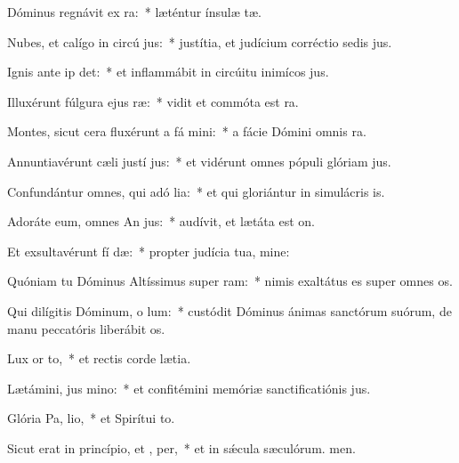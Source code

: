 \item Dóminus regnávit ex ra:~* læténtur ínsulæ tæ.
\item Nubes, et calígo in circú jus:~* justítia, et judícium corréctio sedis jus.
\item Ignis ante ip det:~* et inflammábit in circúitu inimícos jus.
\item Illuxérunt fúlgura ejus  ræ:~* vidit et commóta est ra.
\item Montes, sicut cera fluxérunt a fá mini:~* a fácie Dómini omnis ra.
\item Annuntiavérunt cæli justí jus:~* et vidérunt omnes pópuli glóriam jus.
\item Confundántur omnes, qui adó lia:~* et qui gloriántur in simulácris is.
\item Adoráte eum, omnes An jus:~* audívit, et lætáta est on.
\item Et exsultavérunt fí dæ:~* propter judícia tua, mine:
\item Quóniam tu Dóminus Altíssimus super  ram:~* nimis exaltátus es super omnes os.
\item Qui dilígitis Dóminum, o lum:~* custódit Dóminus ánimas sanctórum suórum, de manu peccatóris liberábit os.
\item Lux or  to,~* et rectis corde lætia.
\item Lætámini, jus  mino:~* et confitémini memóriæ sanctificatiónis jus.
\item Glória Pa,  lio,~* et Spirítui to.
\item Sicut erat in princípio, et ,  per,~* et in sǽcula sæculórum. men.
